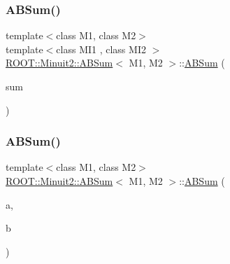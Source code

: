 \subsubsection{\texorpdfstring{ABSum()}{ABSum()}\hspace{0.1cm}{\footnotesize\ttfamily [3/9]}}
{\footnotesize\ttfamily template$<$class M1, class M2$>$ \\
template$<$class M\+I1 , class M\+I2 $>$ \\
\mbox{\hyperlink{classROOT_1_1Minuit2_1_1ABSum}{R\+O\+O\+T\+::\+Minuit2\+::\+A\+B\+Sum}}$<$ M1, M2 $>$\+::\mbox{\hyperlink{classROOT_1_1Minuit2_1_1ABSum}{A\+B\+Sum}} (\begin{DoxyParamCaption}\item[{const \mbox{\hyperlink{classROOT_1_1Minuit2_1_1ABSum}{A\+B\+Sum}}$<$ M\+I1, M\+I2 $>$ \&}]{sum }\end{DoxyParamCaption})\hspace{0.3cm}{\ttfamily [inline]}}

\mbox{\label{classROOT_1_1Minuit2_1_1ABSum_adaac8ec05b73e9e86e736faab9a685fe}} 
\subsubsection{\texorpdfstring{ABSum()}{ABSum()}\hspace{0.1cm}{\footnotesize\ttfamily [4/9]}}
{\footnotesize\ttfamily template$<$class M1, class M2$>$ \\
\mbox{\hyperlink{classROOT_1_1Minuit2_1_1ABSum}{R\+O\+O\+T\+::\+Minuit2\+::\+A\+B\+Sum}}$<$ M1, M2 $>$\+::\mbox{\hyperlink{classROOT_1_1Minuit2_1_1ABSum}{A\+B\+Sum}} (\begin{DoxyParamCaption}\item[{const M1 \&}]{a,  }\item[{const M2 \&}]{b }\end{DoxyParamCaption})\hspace{0.3cm}{\ttfamily [inline]}}

\mbox{\label{classROOT_1_1Minuit2_1_1ABSum_ab2d4441bcbcb38be86091d5eda7b63b2}} 
